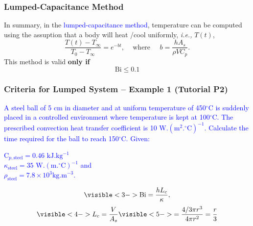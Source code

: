 \documentclass[10pt,compress,unknownkeysallowed]{beamer}
\newcommand{\ie}{{\it i.e., }}
\newcommand{\frc}{\displaystyle\frac}
\newcommand{\blue}{\textcolor{blue}}
\newcommand{\dimensionless}[1]{\mathrm{#1}}
\newcommand{\Bi}{\dimensionless{Bi}}
\begin{document}
\begin{frame}
 \frametitle{Lumped-Capacitance Method}
    \begin{shaded}
       In summary, in the \blue{lumped-capacitance method}, temperature can be computed using the assuption that a body will heat /cool uniformly, \ie $T(t)$,
          \begin{displaymath}
             \frc{T(t)-T_{\infty}}{T_{0}-T_{\infty}} = e^{-bt},\;\;\;\text{ where }\;\;\;\ b = \frc{hA_{s}}{\rho V C_{p}}.
          \end{displaymath}
This method is valid {\bf only if}
           \begin{displaymath}
               \Bi \le 0.1
           \end{displaymath}
    \end{shaded}

\end{frame}


\begin{frame} %
 \frametitle{Criteria for Lumped System --  Example 1 (Tutorial P2)}
      \blue{A steel ball of 5 cm in diameter and at uniform temperature of 450$^{\circ}$C is suddenly placed in a controlled environment where temperature is kept at 100$^{\circ}$C.  The prescribed convection heat transfer coefficient is 10 W.$\left(\text{m}^{2}.^{\circ}\text{C}\right)^{-1}$. Calculate the time required for the ball to reach 150$^{\circ}$C. Given:}

\begin{flushleft}
  \blue{C$_{p,\text{steel}} = 0.46\text{ kJ.kg}^{-1}$} \\
  \blue{$\kappa_{\text{steel}}=35\text{ W.}\left(\text{m.}^{\circ}\text{C}\right)^{-1}$ and} \\
  \blue{$\rho_{\text{steel}}=7.8\times 10^{3}\text{kg.m}^{-3}$.}
\end{flushleft}

    \begin{displaymath}
       \visible<3->{ \Bi = \frc{hL_{c}}{\kappa}, }
    \end{displaymath}
    \begin{displaymath}
       \visible<4->{ L_{c}=\frc{V}{A_{s}} }\visible<5->{= \frc{4/3\pi r^{3}}{4\pi r^{2}} = \frc{r}{3}}
    \end{displaymath}

\end{frame}
\end{document}
